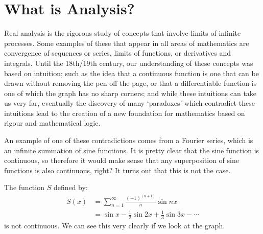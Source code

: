 \documentclass[../real_analysis.tex]{subfiles}
\begin{document}
    \section{What is Analysis?}
        Real analysis is the rigorous study of concepts that involve limits of infinite processes.
        Some examples of these that appear in all areas of mathematics are convergence of sequences or series, limits of functions, or derivatives and integrals.
        Until the 18th/19th century, our understanding of these concepts was based on intuition;
        such as the idea that a continuous function is one that can be drawn without removing the pen off the page, or that a differentiable function is one of which the graph has no sharp corners;
        and while these intuitions can take us very far, eventually the discovery of many `paradoxes' which contradict these intuitions lead to the creation of a new foundation for mathematics based on rigour and mathematical logic.

        An example of one of these contradictions comes from a Fourier series, which is an infinite summation of sine functions.
        It is pretty clear that the sine function is continuous, so therefore it would make sense that any superposition of sine functions is also continuous, right? It turns out that this is not the case.
        \begin{example}
            The function $S$ defined by:
            \begin{align}
                S(x) & = \sum_{n=1}^\infty\frac{(-1)^{(n+1)}}{n}\sin{nx}        \\
                    & = \sin{x}-\frac{1}{2}\sin{2x}+\frac{1}{3}\sin{3x}-\cdots
            \end{align}
            is not continuous. We can see this very clearly if we look at the graph.
        \end{example}
\end{document}
